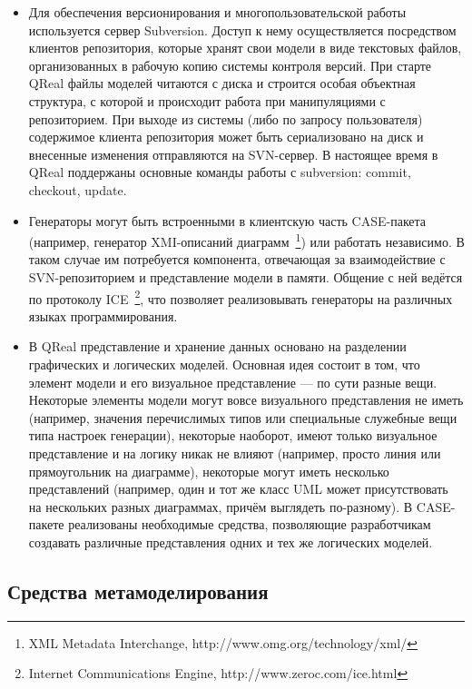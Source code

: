 \documentclass[a4paper]{article}
\begin{document}
\begin{itemize}
  \item Для обеспечения версионирования и многопользовательской работы используется сервер Subversion. Доступ к нему осуществляется посредством клиентов репозитория, которые хранят свои модели в виде текстовых файлов, организованных в рабочую копию системы контроля версий. При старте QReal файлы моделей читаются с диска и строится особая объектная структура, с которой и происходит работа при манипуляциями с репозиторием. При выходе из системы (либо по запросу пользователя) содержимое клиента репозитория может быть сериализовано на диск и внесенные изменения отправляются на SVN-сервер. В настоящее время в QReal поддержаны основные команды работы с subversion: commit, checkout, update. 
  \item Генераторы могут быть встроенными в клиентскую часть CASE-пакета (например, генератор XMI-описаний диаграмм~\footnote{XML Metadata Interchange, http://www.omg.org/technology/xml/}) или работать независимо. В таком случае им потребуется компонента, отвечающая за взаимодействие с SVN-репозиторием и представление модели в памяти. Общение с ней ведётся по протоколу ICE~\footnote{Internet Communications Engine, http://www.zeroc.com/ice.html}, что позволяет реализовывать генераторы на различных языках программирования.
  \item В QReal представление и хранение данных основано на разделении графических и логических моделей. Основная идея состоит в том, что элемент модели и его визуальное представление --- по сути разные вещи. Некоторые элементы модели могут вовсе визуального представления не иметь (например, значения перечислимых типов или специальные служебные вещи типа настроек генерации), некоторые наоборот, имеют только визуальное представление и на логику никак не влияют (например, просто линия или прямоугольник на диаграмме), некоторые могут иметь несколько представлений (например, один и тот же класс UML может присутствовать на нескольких разных диаграммах, причём выглядеть по-разному). В CASE-пакете реализованы необходимые средства, позволяющие разработчикам создавать различные представления одних и тех же логических моделей.
\end{itemize}


\subsection{Средства метамоделирования}
\end{document}
